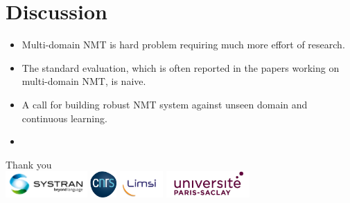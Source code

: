 \documentclass{beamer}
\newcommand{\fyTodo}[1]{\Todo[FY:]{\textcolor{orange}{#1}}}
\begin{document}
\section{Discussion} %

\begin{frame}
\begin{itemize}
	\item Multi-domain NMT is hard problem requiring much more effort of research.
	\item The standard evaluation, which is often reported in the papers working on multi-domain NMT, is naive.
	\item A call for building robust NMT system against unseen domain and continuous learning.
	\item \fyTodo{To add more conclusions}
	
\end{itemize}
\end{frame}

\begin{frame}

\centering
\Huge
Thank you \\
\vspace{1.5cm}
    \includegraphics[height=1.0cm]{systran-logo.png}
    \includegraphics[height=1.0cm]{cnrs-logo.png}
    \includegraphics[height=1.0cm]{limsi-logo.png}
    \includegraphics[height=1.0cm]{ups-logo.png}
\end{frame}


\end{document}
